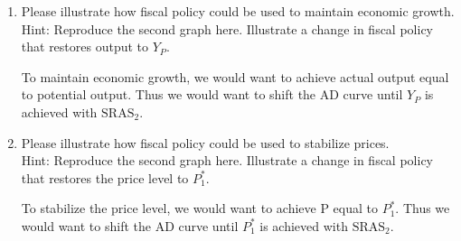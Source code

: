 \documentclass{assignment}
\begin{document}
\begin{enumerate}

\item \label{maintain-output} Please illustrate how fiscal policy could be used to maintain economic growth. \\ {\footnotesize Hint: Reproduce the second graph here. Illustrate a change in fiscal policy that restores output to $Y_P$.}

\begin{solution}
To maintain economic growth, we would want to achieve actual output equal to potential output. Thus we would want to shift the AD curve until $Y_P$ is achieved with $\text{SRAS}_2$.

\end{solution}

\item \label{maintain-prices} Please illustrate how fiscal policy could be used to stabilize prices. \\ {\footnotesize Hint: Reproduce the second graph here. Illustrate a change in fiscal policy that restores the price level to $P^*_1$.}

\begin{solution}
To stabilize the price level, we would want to achieve P equal to $P^*_1$. Thus we would want to shift the AD curve until $P^*_1$ is achieved with $\text{SRAS}_2$.


\end{solution}
\end{enumerate}
\end{document}
